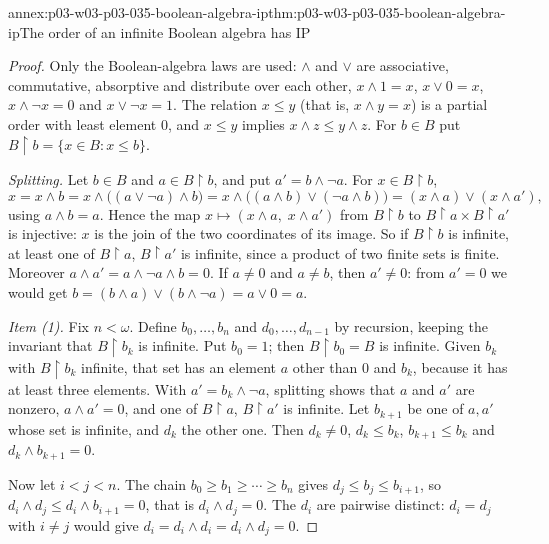 \begin{annexitem}{annex:p03-w03-p03-035-boolean-algebra-ip}{thm:p03-w03-p03-035-boolean-algebra-ip}{The order of an infinite Boolean algebra has IP}
\begin{proof}
Only the Boolean-algebra laws are used: \(\wedge\) and \(\vee\) are
associative, commutative, absorptive and distribute over each other,
\(x\wedge 1=x\), \(x\vee 0=x\), \(x\wedge\neg x=0\) and \(x\vee\neg x=1\).
The relation \(x\leq y\) (that is, \(x\wedge y=x\)) is a partial order with
least element \(0\), and \(x\leq y\) implies \(x\wedge z\leq y\wedge z\).  For
\(b\in B\) put \(B{\restriction}b=\{x\in B:x\leq b\}\).

\emph{Splitting.}  Let \(b\in B\) and \(a\in B{\restriction}b\), and put
\(a'=b\wedge\neg a\).  For \(x\in B{\restriction}b\),
\[
 x=x\wedge b=x\wedge\bigl((a\vee\neg a)\wedge b\bigr)
  =x\wedge\bigl((a\wedge b)\vee(\neg a\wedge b)\bigr)
  =(x\wedge a)\vee(x\wedge a'),
\]
using \(a\wedge b=a\).  Hence the map
\(x\mapsto(x\wedge a,\;x\wedge a')\) from \(B{\restriction}b\) to
\(B{\restriction}a\times B{\restriction}a'\) is injective: \(x\) is the join
of the two coordinates of its image.  So if \(B{\restriction}b\) is infinite,
at least one of \(B{\restriction}a\), \(B{\restriction}a'\) is infinite,
since a product of two finite sets is finite.  Moreover
\(a\wedge a'=a\wedge\neg a\wedge b=0\).  If \(a\neq 0\) and \(a\neq b\), then
\(a'\neq 0\): from \(a'=0\) we would get
\(b=(b\wedge a)\vee(b\wedge\neg a)=a\vee 0=a\).

\emph{Item \textup{(1)}.}  Fix \(n<\omega\).  Define \(b_0,\ldots,b_n\) and
\(d_0,\ldots,d_{n-1}\) by recursion, keeping the invariant that
\(B{\restriction}b_k\) is infinite.  Put \(b_0=1\); then
\(B{\restriction}b_0=B\) is infinite.  Given \(b_k\) with
\(B{\restriction}b_k\) infinite, that set has an element \(a\) other than
\(0\) and \(b_k\), because it has at least three elements.  With
\(a'=b_k\wedge\neg a\), splitting shows that \(a\) and \(a'\) are nonzero,
\(a\wedge a'=0\), and one of \(B{\restriction}a\), \(B{\restriction}a'\) is
infinite.  Let \(b_{k+1}\) be one of \(a,a'\) whose set is infinite, and
\(d_k\) the other one.  Then \(d_k\neq 0\), \(d_k\leq b_k\),
\(b_{k+1}\leq b_k\) and \(d_k\wedge b_{k+1}=0\).

Now let \(i<j<n\).  The chain \(b_0\geq b_1\geq\cdots\geq b_n\) gives
\(d_j\leq b_j\leq b_{i+1}\), so
\(d_i\wedge d_j\leq d_i\wedge b_{i+1}=0\), that is \(d_i\wedge d_j=0\).  The
\(d_i\) are pairwise distinct: \(d_i=d_j\) with \(i\neq j\) would give
\(d_i=d_i\wedge d_i=d_i\wedge d_j=0\).


\end{proof}
\end{annexitem}
